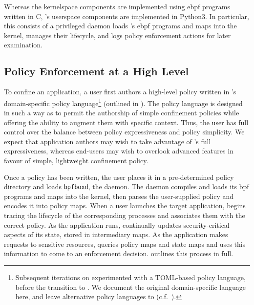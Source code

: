 Whereas the kernelspace components are implemented using \gls{ebpf} programs written in C,
\bpfbox{}'s userspace components are implemented in Python3. In particular, this consists
of a privileged daemon loads \bpfbox{}'s \gls{ebpf} programs and maps into the kernel,
manages their lifecycle, and logs policy enforcement actions for later examination.


\subsection{Policy Enforcement at a High Level}%
\label{ss:bpfbox-enforcement-overview}

To confine an application, a user first authors a high-level policy written in \bpfbox{}'s
domain-specific policy language\footnote{Subsequent iterations on \bpfbox{} experimented
with a TOML-based policy language, before the transition to \bpfcontain{}. We document the
original domain-specific language here, and leave alternative policy languages to
\bpfcontain{} (c.f.\ ).} (outlined in ). The
policy language is designed in such a way as to permit the authorship of simple
confinement policies while offering the ability to augment them with specific context.
Thus, the user has full control over the balance between policy expressiveness and policy
simplicity. We expect that application authors may wish to take advantage of \bpfbox{}'s
full expressiveness, whereas end-users may wish to overlook advanced features in favour of
simple, lightweight confinement policy.

Once a policy has been written, the user places it in a pre-determined policy directory
and loads \texttt{bpfboxd}, the \bpfbox{} daemon. The daemon compiles and loads its
\gls{bpf} programs and maps into the kernel, then parses the user-supplied policy and
encodes it into policy maps. When a user launches the target application, \bpfbox{} begins
tracing the lifecycle of the corresponding processes and associates them with the correct
policy. As the application runs, \bpfbox{} continually updates security-critical aspects
of its state, stored in intermediary maps. As the application makes requests to sensitive
resources, \bpfbox{} queries policy maps and state maps and uses this information to come
to an enforcement decision.  outlines this process in full.

